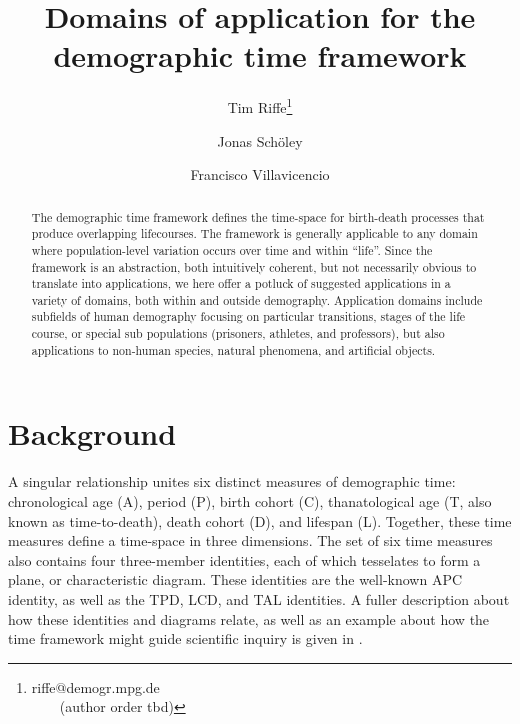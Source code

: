 \documentclass[11pt,oneside]{article} %
\begin{document}
\title{Domains of application for the demographic time framework}

\author[1]{Tim Riffe\thanks{riffe@demogr.mpg.de\\ ~~~~(author order tbd)}}
\author[2,3]{Jonas Sch{\"o}ley}
\author[2,3]{Francisco Villavicencio}



\maketitle

\begin{abstract}
The demographic time framework defines the time-space for birth-death processes
that produce overlapping lifecourses. The framework is generally applicable to
any domain where population-level variation occurs over time and within ``life''. Since the
framework is an abstraction, both intuitively coherent, but not
necessarily obvious to translate into applications, we here offer a potluck of
suggested applications in a variety of domains, both within and outside demography.
Application domains include subfields of human demography focusing on particular transitions, stages of the life course, or special sub populations (prisoners, athletes, and professors), but also applications to non-human species, natural phenomena, and artificial objects.
\end{abstract}

\section*{Background}



A singular relationship unites six distinct measures of demographic time:
chronological age (A), period (P), birth cohort (C), thanatological age (T,
also known as time-to-death), death cohort (D), and lifespan (L). Together,
these time measures define a time-space in three dimensions. The set of six
time measures also contains four three-member identities, each of which
tesselates to form a plane, or characteristic diagram. These identities are the
well-known APC identity, as well as the TPD, LCD, and TAL identities. A
fuller description about how these identities and diagrams relate, as well as an
example about how the time framework might guide scientific inquiry is given in
\citet{rsv2015}. 
\end{document}
